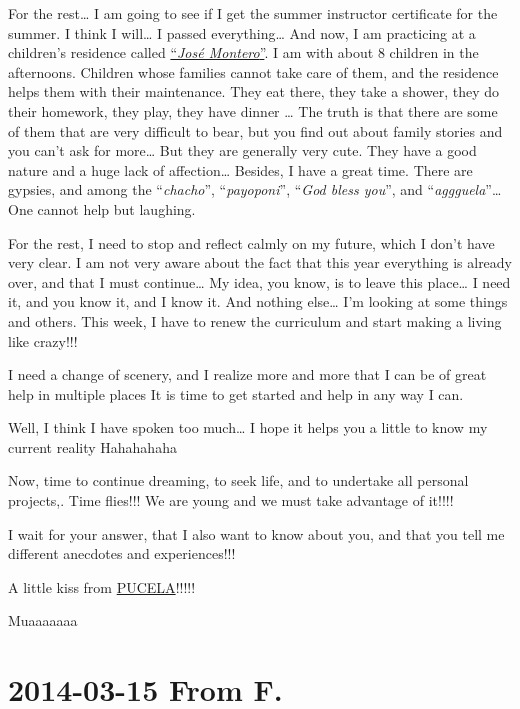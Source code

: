 \documentclass[]{book}
\begin{document}
For the rest\ldots{} I am going to see if I get the summer instructor certificate for the summer. I think I will\ldots{} I passed everything\ldots{} And now, I am practicing at a children's residence called \href{http://www.jcyl.es/web/jcyl/Portada/es/Plantilla100Directorio/1248366924958/0/1142233565782/DirectorioPadre}{``\emph{José Montero}''}. I am with about 8 children in the afternoons. Children whose families cannot take care of them, and the residence helps them with their maintenance. They eat there, they take a shower, they do their homework, they play, they have dinner \ldots{} The truth is that there are some of them that are very difficult to bear, but you find out about family stories and you can't ask for more\ldots{} But they are generally very cute. They have a good nature and a huge lack of affection\ldots{} Besides, I have a great time. There are gypsies, and among the ``\emph{chacho}'', ``\emph{payoponi}'', ``\emph{God bless you}'', and ``\emph{aggguela}''\ldots{} One cannot help but laughing.

For the rest, I need to stop and reflect calmly on my future, which I don't have very clear. I am not very aware about the fact that this year everything is already over, and that I must continue\ldots{} My idea, you know, is to leave this place\ldots{} I need it, and you know it, and I know it. And nothing else\ldots{} I'm looking at some things and others. This week, I have to renew the curriculum and start making a living like crazy!!!

I need a change of scenery, and I realize more and more that I can be of great help in multiple places It is time to get started and help in any way I can.

Well, I think I have spoken too much\ldots{} I hope it helps you a little to know my current reality Hahahahaha

Now, time to continue dreaming, to seek life, and to undertake all personal projects,. Time flies!!! We are young and we must take advantage of it!!!!

I wait for your answer, that I also want to know about you, and that you tell me different anecdotes and experiences!!!

A little kiss from \href{https://en.wikipedia.org/wiki/Valladolid}{PUCELA}!!!!!

Muaaaaaaa

\hypertarget{fromF20140315}{%
\section*{2014-03-15 From F.}\label{fromF20140315}}
\end{document}
